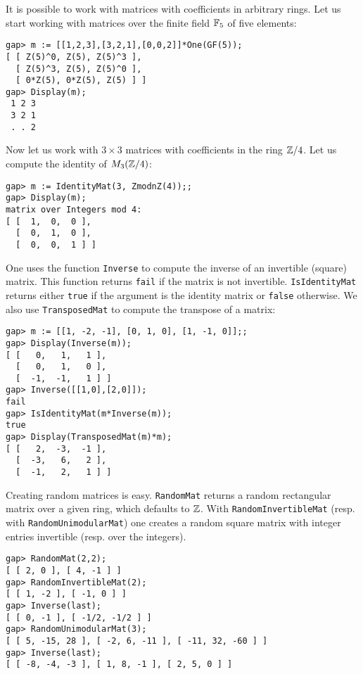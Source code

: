 It is possible to work with matrices with coefficients in arbitrary rings. Let
us start working with matrices over the finite field $\mathbb{F}_5$ of five elements:
\begin{lstlisting}
gap> m := [[1,2,3],[3,2,1],[0,0,2]]*One(GF(5));
[ [ Z(5)^0, Z(5), Z(5)^3 ], 
  [ Z(5)^3, Z(5), Z(5)^0 ], 
  [ 0*Z(5), 0*Z(5), Z(5) ] ]
gap> Display(m);
 1 2 3
 3 2 1
 . . 2
\end{lstlisting}
Now let us work with $3\times 3$ matrices with coefficients 
in the ring $\mathbb{Z}/4$. Let us compute the identity of $M_3(\mathbb{Z}/4)$:
\begin{lstlisting}
gap> m := IdentityMat(3, ZmodnZ(4));;
gap> Display(m);
matrix over Integers mod 4:
[ [  1,  0,  0 ],
  [  0,  1,  0 ],
  [  0,  0,  1 ] ]
\end{lstlisting}

One uses the function \lstinline{Inverse} to compute the inverse of an
invertible (square) matrix.  
This function returns \lstinline{fail} if the matrix is not invertible. 
\lstinline{IsIdentityMat} returns either
\lstinline{true} if the argument is the identity matrix or \lstinline{false}
otherwise.  We also use \lstinline{TransposedMat} to compute the transpose of a
matrix:
\begin{lstlisting}
gap> m := [[1, -2, -1], [0, 1, 0], [1, -1, 0]];;
gap> Display(Inverse(m));
[ [   0,   1,   1 ],
  [   0,   1,   0 ],
  [  -1,  -1,   1 ] ]
gap> Inverse([[1,0],[2,0]]);
fail
gap> IsIdentityMat(m*Inverse(m));
true 
gap> Display(TransposedMat(m)*m);
[ [   2,  -3,  -1 ],
  [  -3,   6,   2 ],
  [  -1,   2,   1 ] ]
\end{lstlisting}	

Creating random matrices is easy.  \lstinline{RandomMat} returns a random
rectangular matrix over a given ring, which defaults to $\mathbb{Z}$. With
\lstinline{RandomInvertibleMat} (resp. with \lstinline{RandomUnimodularMat})
one creates a random square matrix with integer entries invertible (resp. over
the integers).
\begin{lstlisting}
gap> RandomMat(2,2);
[ [ 2, 0 ], [ 4, -1 ] ]
gap> RandomInvertibleMat(2);
[ [ 1, -2 ], [ -1, 0 ] ]
gap> Inverse(last);
[ [ 0, -1 ], [ -1/2, -1/2 ] ]
gap> RandomUnimodularMat(3);
[ [ 5, -15, 28 ], [ -2, 6, -11 ], [ -11, 32, -60 ] ]
gap> Inverse(last);
[ [ -8, -4, -3 ], [ 1, 8, -1 ], [ 2, 5, 0 ] ]
\end{lstlisting}

